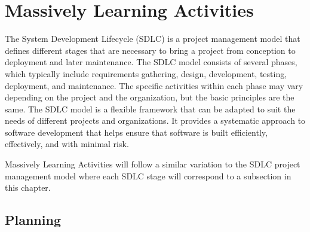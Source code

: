 \section{Massively Learning Activities} \label{section: MLA}
The System Development Lifecycle (SDLC) is a project management model that defines different stages that are necessary to bring a project from conception to deployment and later maintenance. The SDLC model consists of several phases, which typically include requirements gathering, design, development, testing, deployment, and maintenance. The specific activities within each phase may vary depending on the project and the organization, but the basic principles are the same. The SDLC model is a flexible framework that can be adapted to suit the needs of different projects and organizations. It provides a systematic approach to software development that helps ensure that software is built efficiently, effectively, and with minimal risk.

Massively Learning Activities will follow a similar variation to the SDLC project management model where each SDLC stage will correspond to a subsection in this chapter. 

\subsection{Planning}

